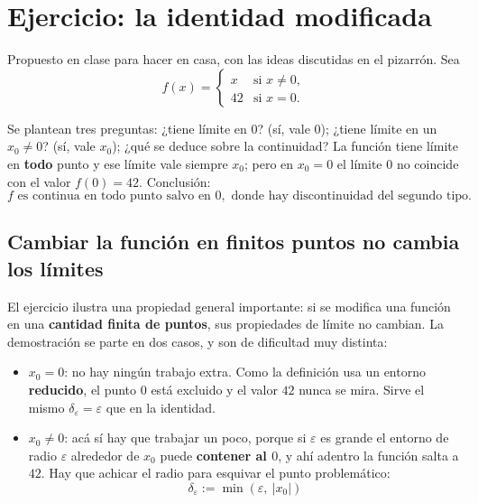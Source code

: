 \documentclass[12pt,a4paper]{article}
\begin{document}
\section{Ejercicio: la identidad modificada}

Propuesto en clase para hacer en casa, con las ideas discutidas en el
pizarrón. Sea
\[
  f(x) = \begin{cases}
    x & \text{si } x \neq 0, \\
    42 & \text{si } x = 0.
  \end{cases}
\]

Se plantean tres preguntas: ¿tiene límite en $0$? (sí, vale $0$); ¿tiene
límite en un $x_0 \neq 0$? (sí, vale $x_0$); ¿qué se deduce sobre la
continuidad? La función tiene límite en \textbf{todo} punto y ese límite vale
siempre $x_0$; pero en $x_0 = 0$ el límite $0$ no coincide con el valor
$f(0) = 42$. Conclusión:
\[
  \boxed{f \text{ es continua en todo punto salvo en } 0,
  \text{ donde hay discontinuidad del segundo tipo.}}
\]

\subsection{Cambiar la función en finitos puntos no cambia los límites}

El ejercicio ilustra una propiedad general importante: si se modifica una
función en una \textbf{cantidad finita de puntos}, sus propiedades de límite no
cambian. La demostración se parte en dos casos, y son de dificultad muy
distinta:

\begin{itemize}
  \item \textbf{$x_0 = 0$}: no hay ningún trabajo extra. Como la definición usa
        un entorno \textbf{reducido}, el punto $0$ está excluido y el valor
        $42$ nunca se mira. Sirve el mismo $\delta_\varepsilon = \varepsilon$
        que en la identidad.
  \item \textbf{$x_0 \neq 0$}: acá sí hay que trabajar un poco, porque si
        $\varepsilon$ es grande el entorno de radio $\varepsilon$ alrededor de
        $x_0$ puede \textbf{contener al $0$}, y ahí adentro la función salta a
        $42$. Hay que achicar el radio para esquivar el punto problemático:
        \[
          \boxed{\delta_\varepsilon := \min\left(\varepsilon,\ |x_0|\right)}
        \]
\end{itemize}


\end{document}
